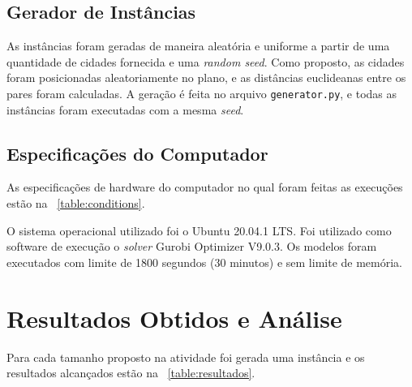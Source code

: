 \documentclass{TEMA}
\begin{document}
\subsection{Gerador de Instâncias}
        As instâncias foram geradas de maneira aleatória e uniforme a partir de uma quantidade de cidades fornecida e uma \textit{random seed}. Como proposto, as cidades foram posicionadas aleatoriamente no plano, e as distâncias euclideanas entre os pares foram calculadas. A geração é feita no arquivo \texttt{generator.py}, e todas as instâncias foram executadas com a mesma \textit{seed}.
\subsection{Especificações do Computador}
    As especificações de hardware do computador no qual foram feitas as execuções estão na \tablename~\ref{table:conditions}.
    
    \vspace{-0.3cm}
    \begin{table}[ht!]
        \centering
        \caption{Condições de Execução}
        \label{table:conditions}
        \vspace{0.3cm}
    \end{table}
    
    O sistema operacional utilizado foi o Ubuntu 20.04.1 LTS. Foi utilizado como software de execução o \textit{solver} Gurobi Optimizer V9.0.3. Os modelos foram executados com limite de 1800 segundos (30 minutos) e sem limite de memória.
\vspace{-0.18cm}
\section{Resultados Obtidos e Análise}
        Para cada tamanho proposto na atividade foi gerada uma instância e os resultados alcançados estão na \tablename~\ref{table:resultados}. 
        \vspace{-0.5cm}
        
\end{document}
